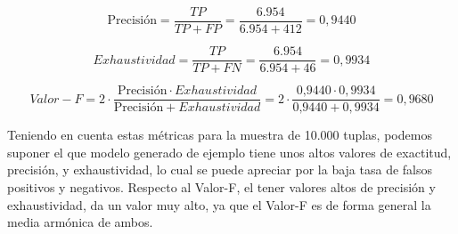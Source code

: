 \begin{equation*}
\mbox{Precisión} = \frac{TP}{TP + FP} = \frac{6.954}{6.954 + 412} = 0,9440
\end{equation*}

\begin{equation*}
Exhaustividad = \frac{TP}{TP + FN} = \frac{6.954}{6.954 + 46} = 0,9934
\end{equation*}

\begin{equation*}
Valor-F = 2 \cdot \frac{\mbox{Precisión} \cdot Exhaustividad}{\mbox{Precisión} + Exhaustividad} 
		= 2 \cdot \frac{\mbox{0,9440} \cdot 0,9934}{\mbox{0,9440} + 0,9934}
		= 0,9680
\end{equation*}

Teniendo en cuenta estas métricas para la muestra de 10.000 tuplas, podemos suponer el que modelo generado de ejemplo tiene unos altos valores de exactitud, precisión, y exhaustividad, lo cual se puede apreciar por la baja tasa de falsos positivos y negativos. Respecto al Valor-F, el tener valores altos de precisión y exhaustividad, da un valor muy alto, ya que el Valor-F es de forma general la media armónica de ambos.

